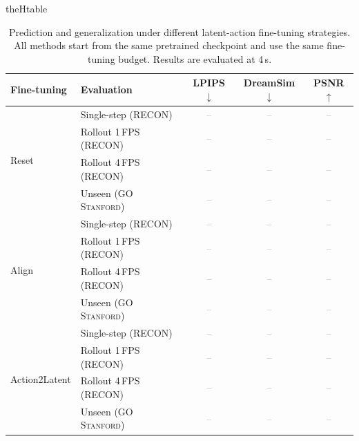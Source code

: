 \documentclass{article}
\newcommand{\TBD}{\textcolor{gray}{--}}
\newcommand{\UnseenData}{\textsc{GO Stanford}}
\newcommand{\LPIPS}{LPIPS$\downarrow$}
\newcommand{\DreamSim}{DreamSim$\downarrow$}
\newcommand{\PSNR}{PSNR$\uparrow$}
\newcommand{\tablepart}[1]{%
  \renewcommand{\thetable}{\arabic{table}#1}%
  \ifcsname theHtable\endcsname
    \renewcommand{\theHtable}{\arabic{table}.#1}%
  \fi
}
\begin{document}
\begin{table}[t]
  \tablepart{a}
  \caption{Prediction and generalization under different latent-action
  fine-tuning strategies. All methods start from the same pretrained checkpoint
  and use the same fine-tuning budget. Results are evaluated at 4\,s.}
  \label{tab:finetuning_prediction}
  \centering
  \small
  \setlength{\tabcolsep}{6pt}
  \renewcommand{\arraystretch}{1.02}
  \begin{tabular}{llccc}
    \toprule
    Fine-tuning & Evaluation & \LPIPS & \DreamSim & \PSNR \\
    \midrule
    \multirow{4}{*}{Reset}
    & Single-step (RECON) & \TBD & \TBD & \TBD \\
    & Rollout 1\,FPS (RECON) & \TBD & \TBD & \TBD \\
    & Rollout 4\,FPS (RECON) & \TBD & \TBD & \TBD \\
    & Unseen (\UnseenData{}) & \TBD & \TBD & \TBD \\
    \midrule
    \multirow{4}{*}{Align}
    & Single-step (RECON) & \TBD & \TBD & \TBD \\
    & Rollout 1\,FPS (RECON) & \TBD & \TBD & \TBD \\
    & Rollout 4\,FPS (RECON) & \TBD & \TBD & \TBD \\
    & Unseen (\UnseenData{}) & \TBD & \TBD & \TBD \\
    \midrule
    \multirow{4}{*}{Action2Latent}
    & Single-step (RECON) & \TBD & \TBD & \TBD \\
    & Rollout 1\,FPS (RECON) & \TBD & \TBD & \TBD \\
    & Rollout 4\,FPS (RECON) & \TBD & \TBD & \TBD \\
    & Unseen (\UnseenData{}) & \TBD & \TBD & \TBD \\
    \bottomrule
  \end{tabular}
\end{table}
\end{document}
